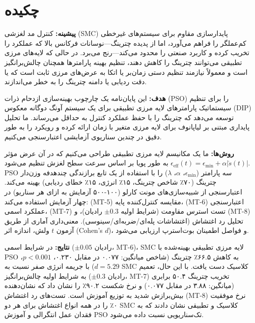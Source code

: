 
\chapter*{چکیده}

\begin{persian}

\noindent
\textbf{پیشینه:}
کنترل مد لغزشی (SMC) پایدارسازی مقاوم برای سیستم‌های غیرخطی کم‌عملگر را فراهم می‌آورد، اما از پدیده چترینگ—نوسانات فرکانس بالا که عملکرد را تخریب کرده و کاربرد صنعتی را محدود می‌کند—رنج می‌برد. در حالی که لایه‌های مرزی تطبیقی می‌توانند چترینگ را کاهش دهند، تنظیم بهینه پارامترها همچنان چالش‌برانگیز است و معمولاً نیازمند تنظیم دستی زمان‌بر یا اتکا به عرض‌های مرزی ثابت است که یا دقت ردیابی یا دامنه چترینگ را به خطر می‌اندازند.

\vspace{0.5cm}

\noindent
\textbf{هدف:}
این پایان‌نامه یک چارچوب بهینه‌سازی ازدحام ذرات (PSO) را برای تنظیم سیستماتیک پارامترهای لایه مرزی تطبیقی برای یک سیستم آونگ دوگانه معکوس (DIP) توسعه می‌دهد که چترینگ را با حفظ عملکرد کنترل به حداقل می‌رساند. ما تحلیل پایداری مبتنی بر لیاپانوف برای لایه مرزی متغیر با زمان ارائه کرده و رویکرد را به طور دقیق در چندین سناریوی آزمایشی اعتبارسنجی می‌کنیم.

\vspace{0.5cm}

\noindent
\textbf{روش‌ها:}
ما یک مکانیسم لایه مرزی تطبیقی طراحی می‌کنیم که در آن عرض مؤثر $\epsilon_{\text{eff}}(t) = \epsilon_{\min} + \alpha|\dot{s}(t)|$ به طور پویا بر اساس سرعت سطح لغزش تنظیم می‌شود. PSO سه پارامتر ($\epsilon_{\min}$، $\alpha$، $\lambda$) را با استفاده از یک تابع برازندگی چندهدفه وزن‌دار چترینگ (۷۰٪ شاخص چترینگ، ۱۵٪ انرژی، ۱۵٪ خطای ردیابی) بهینه می‌کند. اعتبارسنجی از شبیه‌سازی‌های مونت کارلو (۱۰۰-۵۰۰ آزمایش به ازای هر سناریو) در چهار آزمایش استفاده می‌کند: (MT-5) مقایسه کنترل‌کننده پایه، (MT-6) اعتبارسنجی عملکرد اسمی، (MT-7) تست استرس مقاومت (شرایط اولیه $\pm0.3$ رادیان)، و (MT-8) تحلیل رد اغتشاش (اغتشاشات پله‌ای/ضربه‌ای/سینوسی). معنی‌داری آماری از طریق آزمون $t$ ولش، اندازه اثر (Cohen's $d$)، و فواصل اطمینان بوت‌استرپ ارزیابی می‌شود.

\vspace{0.5cm}

\noindent
\textbf{نتایج:}
در شرایط اسمی ($\pm0.05$ رادیان، MT-6)، SMC لایه مرزی تطبیقی بهینه‌شده با PSO به کاهش ۶۶.۵٪ چترینگ (شاخص میانگین: ۰.۰۷۷ در مقابل ۰.۲۳۰، $p<0.001$، $d=5.29$) با جریمه انرژی صفر نسبت به SMC کلاسیک دست یافت. با این حال، تعمیم به شرایط اولیه چالش‌برانگیز ($\pm0.3$ رادیان، MT-7) تخریب چترینگ ۵۰.۴ برابری (میانگین: ۳.۸۸ در مقابل ۰.۰۷۷) و نرخ شکست ۹۰.۲٪ را نشان داد که نشان‌دهنده بیش‌برازش شدید به توزیع آموزش است. تست‌های رد اغتشاش (MT-8) نرخ موفقیت ۰٪ را در همه انواع اغتشاش برای هر دو SMC کلاسیک و تطبیقی نشان دادند که به فقدان عمل انتگرالی و آموزش PSO تک‌سناریویی نسبت داده می‌شود.


\end{persian}
